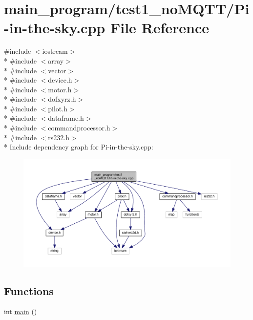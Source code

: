 \hypertarget{test1__no_m_q_t_t_2_pi-in-the-sky_8cpp}{}\section{main\+\_\+program/test1\+\_\+no\+M\+Q\+T\+T/\+Pi-\/in-\/the-\/sky.cpp File Reference}
\label{test1__no_m_q_t_t_2_pi-in-the-sky_8cpp}
{\ttfamily \#include $<$iostream$>$}\\*
{\ttfamily \#include $<$array$>$}\\*
{\ttfamily \#include $<$vector$>$}\\*
{\ttfamily \#include $<$device.\+h$>$}\\*
{\ttfamily \#include $<$motor.\+h$>$}\\*
{\ttfamily \#include $<$dofxyrz.\+h$>$}\\*
{\ttfamily \#include $<$pilot.\+h$>$}\\*
{\ttfamily \#include $<$dataframe.\+h$>$}\\*
{\ttfamily \#include $<$commandprocessor.\+h$>$}\\*
{\ttfamily \#include $<$rs232.\+h$>$}\\*
Include dependency graph for Pi-\/in-\/the-\/sky.cpp\+:
\nopagebreak
\begin{figure}[H]
\begin{center}
\leavevmode
\includegraphics[width=350pt]{test1__no_m_q_t_t_2_pi-in-the-sky_8cpp__incl}
\end{center}
\end{figure}
\subsection*{Functions}
\begin{DoxyCompactItemize}
\item 
int \hyperlink{test1__no_m_q_t_t_2_pi-in-the-sky_8cpp_ae66f6b31b5ad750f1fe042a706a4e3d4}{main} ()
\end{DoxyCompactItemize}
